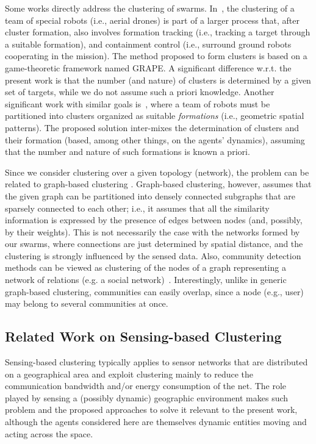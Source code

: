 Some works directly address the clustering of swarms. In~\cite{DBLP:journals/trob/HuBJAL21}, the clustering of a team of special robots (i.e., aerial drones) is part of a larger process that,
 after cluster formation, also involves formation tracking (i.e., tracking a target through a suitable formation), and containment control (i.e., surround ground robots cooperating in the mission).
 The method proposed to form clusters is based on a game-theoretic framework named GRAPE. A significant difference w.r.t. the present work is that the number (and nature) of clusters is determined by a given set of targets,
 while we do not assume such a priori knowledge.
Another significant work with similar goals is~\cite{DBLP:journals/tie/GeHZ18}, where a team of robots must be partitioned into clusters organized as suitable {\em formations} (i.e., geometric spatial patterns).
 The proposed solution inter-mixes the determination of clusters and their formation (based, among other things, on the agents' dynamics), assuming that the number and nature of such formations is known a priori.

Since we consider clustering over a given topology (network), the problem can be related to graph-based clustering \cite{Zheng:2010}.
Graph-based clustering, however, assumes that the given graph can be partitioned into densely connected subgraphs that are sparsely connected to each other; i.e.,
it assumes that all the similarity information is expressed by the presence of edges between nodes (and, possibly, by their weights).
This is not necessarily the case with the networks formed by our swarms, where connections are just determined by spatial distance, and the clustering is strongly influenced by the sensed data.
Also, community detection methods can be viewed as clustering of the nodes of a graph representing a network of relations (e.g. a social network)~\cite{DBLP:journals/jnca/JavedYLQB18}.
Interestingly, unlike in generic graph-based clustering, communities can easily overlap, since a node (e.g., user) may belong to several communities at once.

\subsection{Related Work on Sensing-based Clustering}
\label{s:rw:related-sensingbased-clustering}

Sensing-based clustering typically applies to sensor networks that are distributed on a geographical area and exploit clustering mainly to reduce the communication bandwidth and/or energy consumption of the net.
 The role played by sensing a (possibly dynamic) geographic environment makes such problem and the proposed approaches to solve it relevant to the present work,
 although the agents considered here are themselves dynamic entities moving and acting across the space.


